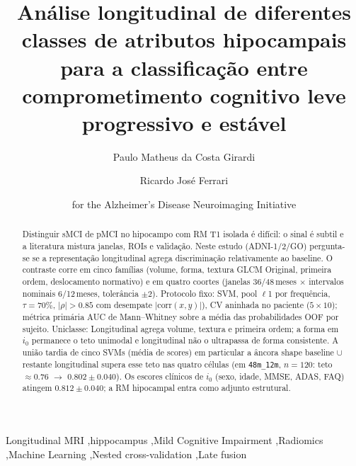 \documentclass[review]{elsarticle}
\newcommand{\code}[1]{\texttt{#1}}
\begin{document}
	\begin{frontmatter}
		
		\title{Análise longitudinal de diferentes classes de atributos hipocampais para a classificação entre comprometimento cognitivo leve progressivo e estável}
		
		\author[ufscar]{Paulo Matheus da Costa Girardi}
		
		\author[ufscar]{Ricardo José Ferrari}
		
		
		\address[ufscar]{Department of Computing, Federal University of São Carlos, Rod.\ Washington Luis, Km 235, 13565-905, São Carlos, SP, Brazil}
		
		\author[]{for the Alzheimer's Disease Neuroimaging Initiative}
		
		\begin{abstract}
			Distinguir sMCI de pMCI no hipocampo com RM T1 isolada é difícil: o sinal é subtil e a literatura mistura janelas, ROIs e validação.
			Neste estudo (ADNI-1/2/GO) pergunta-se se a representação longitudinal  agrega discriminação relativamente ao baseline.
			O contraste corre em cinco famílias (volume, forma, textura GLCM Original, primeira ordem, deslocamento normativo) e em quatro coortes (janelas 36/48\,meses $\times$ intervalos nominais 6/12\,meses, tolerância $\pm 2$).
			Protocolo fixo: SVM, pool $\ell$1 por frequência, $\tau=70\%$, $|\rho|>0.85$ com desempate $|\mathrm{corr}(x,y)|$), CV aninhada no paciente ($5\times 10$); métrica primária AUC de Mann--Whitney sobre a média das probabilidades OOF por sujeito.
			Uniclasse: Longitudinal agrega volume, textura e primeira ordem; a forma em $i_0$ permanece o teto unimodal e longitudinal não o ultrapassa de forma consistente.
			A união tardia de cinco SVMs (média de scores) em particular a âncora shape baseline $\cup$ restante longitudinal supera esse teto nas quatro células (em \code{48m\_12m}, $n=120$: teto $\approx 0.76$ $\to$ $0.802\pm0.040$).
			Os escores clínicos de $i_0$ (sexo, idade, MMSE, ADAS, FAQ) atingem $0.812\pm0.040$; a RM hipocampal entra como adjunto estrutural.
		\end{abstract}
		
		\begin{keyword}
			Longitudinal MRI \sep hippocampus \sep Mild Cognitive Impairment \sep Radiomics \sep Machine Learning \sep Nested cross-validation \sep Late fusion
		\end{keyword}
		
	\end{frontmatter}
	
\end{document}
